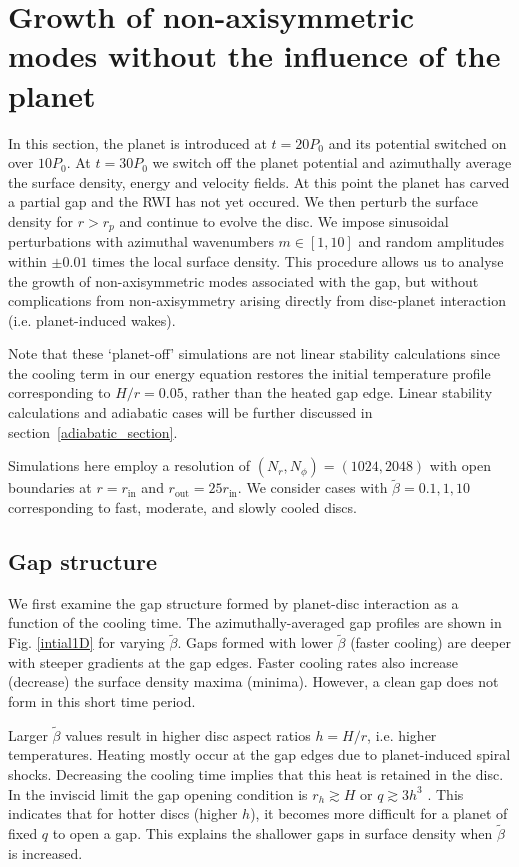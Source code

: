 \section{Growth of non-axisymmetric modes without the influence of the
  planet}\label{linear1}
In this section, the planet is introduced at $t=20P_0$ and 
its potential switched on over $10P_0$. At $t=30P_0$ we switch off the
planet potential and azimuthally average the surface density, energy
and velocity fields. At this point the planet has carved a partial
gap and the RWI has not yet occured.
 We then perturb the surface density for $r>r_p$ and continue to 
evolve the disc. We impose  sinusoidal perturbations with 
azimuthal wavenumbers $m\in[1,10]$ and random amplitudes within $\pm 0.01$
 times the local surface density. 
This procedure allows us to analyse the growth of 
non-axisymmetric modes associated with the gap, but without
complications from non-axisymmetry arising directly from disc-planet
interaction (i.e. planet-induced wakes). 

Note that these `planet-off' simulations are not linear stability
calculations since the cooling term in our energy equation
restores the initial temperature profile corresponding to $H/r=0.05$,
rather than the heated gap edge. Linear stability calculations and
adiabatic cases will be further discussed in
section~\ref{adiabatic_section}.  


Simulations here employ a resolution of $(N_r,N_{\phi})=(1024,2048)$
with open boundaries at $r=r_\mathrm{in}$ and
$r_\mathrm{out}=25r_\mathrm{in}$. We consider   
cases with $\tilde{\beta}=0.1,1,10$ corresponding to fast, moderate,
and slowly cooled discs. %

\subsection{Gap structure}
We first examine the gap structure formed by planet-disc
interaction as a function of the cooling time. The azimuthally-averaged 
gap profiles are shown in Fig. \ref{intial1D} for varying
$\tilde\beta$. Gaps formed with lower $\tilde\beta$ (faster cooling)
are deeper with steeper gradients at the gap edges. Faster cooling rates also 
increase (decrease) the surface density maxima (minima). However, a
clean gap does not form in this short time period. 
 

Larger $\tilde\beta$ values result in higher disc aspect ratios $h=H/r$,
i.e. higher temperatures. Heating mostly occur at the gap edges
due to planet-induced spiral shocks. Decreasing the cooling time
implies that this heat is retained in the disc. In the inviscid limit the gap
opening condition is $r_h\gtrsim H$ or $q\gtrsim 3h^3$
\citep{crida06}. 
This indicates that for hotter discs (higher
$h$), it becomes more difficult for a planet of fixed $q$ to open a
gap. This explains the shallower gaps in surface density when
$\tilde{\beta}$ is increased. 

